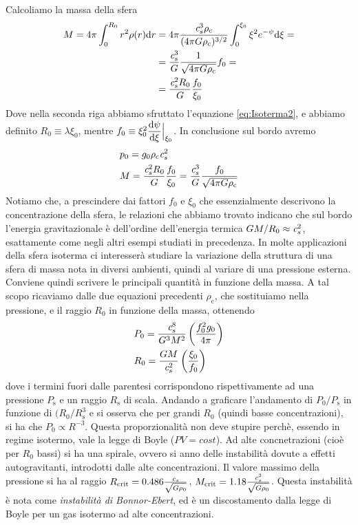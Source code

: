 Calcoliamo la massa della sfera 
\begin{align*}
M = 4\pi \int_0^{R_0} r^2 \rho(r) \mathrm{d} r &= 4\pi \frac{\textit{c}_{s}^3 \rho_\mathrm{c}}{(4\pi G \rho_\mathrm{c})^{3/2}} \int_0^{\xi_0} \xi^2 e^{-\psi} \mathrm{d} \xi = \\
&= \frac{\textit{c}_{s}^3}{G} \frac{1}{\sqrt{4\pi G \rho_\mathrm{c}}} f_0 = \\
&= \frac{\textit{c}_{s}^2 R_0}{G} \frac{f_0}{\xi_0}
\end{align*}
Dove nella seconda riga abbiamo sfruttato l'equazione \ref{eq:Isoterma2}, e abbiamo definito $R_0 \equiv \lambda \xi_0$, mentre $f_0 \equiv \xi_0^2 \dfrac{\mathrm{d} {\psi}}{\mathrm{d} {\xi}} \Big|_{\xi_0}$. In conclusione sul bordo avremo
\begin{align}
& p_0=  g_0 \rho_\mathrm{c}\textit{c}_{s}^2 \\
& M = \frac{\textit{c}_{s}^2 R_0}{G} \frac{f_0}{\xi_0} = \frac{\textit{c}_{s}^3}{G} \frac{f_0}{\sqrt{4\pi G \rho_\mathrm{c}}} 
\end{align}
Notiamo che, a prescindere dai fattori $f_0$ e $\xi_0$ che essenzialmente descrivono la concentrazione della sfera, le relazioni che abbiamo trovato indicano che sul bordo l'energia gravitazionale è dell'ordine dell'energia termica $GM/R_0 \approx \textit{c}_{s}^2$, esattamente come negli altri esempi studiati in precedenza.
In molte applicazioni della sfera isoterma ci interesserà studiare la variazione della struttura di una sfera di massa nota in diversi ambienti, quindi al variare di una pressione esterna. Conviene quindi scrivere le principali quantità in funzione della massa. A tal scopo ricaviamo dalle due equazioni precedenti $\rho_\mathrm{c}$, che sostituiamo nella pressione, e il raggio $R_0$ in funzione della massa, ottenendo
\begin{align}
& P_0= \frac{\textit{c}_{s}^8}{G^3 M^2} \left( \frac{f_0^2 g_0}{4\pi} \right) \\
& R_0= \frac{GM}{\textit{c}_{s}^2} \left( \frac{\xi_0}{f_0} \right)
\end{align}
dove i termini fuori dalle parentesi corrispondono rispettivamente ad una pressione $P_\mathrm{s}$ e un raggio $R_\mathrm{s}$ di scala. Andando a graficare l'andamento di $P_0/P_\mathrm{s}$ in funzione di $(R_0 /R_\mathrm{s}^3$ e si osserva che per grandi $R_0$ (quindi basse concentrazioni), si ha che $P_0 \propto R^{-3}$. Questa proporzionalità non deve stupire perchè, essendo in regime isotermo, vale la legge di Boyle ($PV=cost$). Ad alte concnetrazioni (cioè per $R_0$ bassi) si ha una spirale, ovvero si anno delle instabilità dovute a effetti autogravitanti, introdotti dalle alte concentrazioni. Il valore massimo della pressione si ha al raggio $R_\mathrm{crit} = 0.486 \frac{\textit{c}_{s}}{\sqrt{G\rho_0}}$, $M_\mathrm{crit} = 1.18 \frac{\textit{c}_{s}^3}{\sqrt{G \rho_0}}$. Questa instabilità è nota come \textit{instabilità di Bonnor-Ebert}, ed è un discostamento dalla legge di Boyle per un gas isotermo ad alte concentrazioni.

